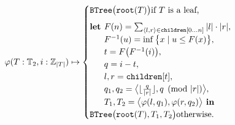 \documentclass[sigplan,nonacm]{acmart}\settopmatter{printfolios=false,printccs=false,printacmref=false}
\begin{document}
\begin{small}
\begin{equation*}\label{eq:pairing}
\varphi(T: \mathbb{T}_2, i: \mathbb{Z}_{|T|}) \mapsto \begin{cases}
\texttt{BTree}\big(\texttt{root}(T)\big) \text{if $T$ is a leaf,} \vspace{5pt}\\
\textbf{let } F(n) = \sum_{\langle l, r\rangle \in \texttt{children}[0 \ldots n]}|l|\cdot|r|,\\
\phantom{\textbf{let }} F^{-1}(u) = \inf \big\{x \mid u \leq F(x)\big\},\\
\phantom{\textbf{let }} t = F\big(F^{-1}(i)\big),\\
\phantom{\textbf{let }} q = i - t,\\
\phantom{\textbf{let }} l, r = \texttt{children}[t],\\
\phantom{\textbf{let }} q_1, q_2 = \big\langle\lfloor\frac{q}{|r|}\rfloor, q \pmod{|r|}\big\rangle,\\
\phantom{\textbf{let }} T_1, T_2 = \big\langle\varphi(l, q_1), \varphi(r, q_2)\big\rangle \textbf{ in } \\
\texttt{BTree}\big(\texttt{root}(T), T_1, T_2\big) \text{otherwise.} \\
\end{cases}
\end{equation*}
\end{small}

\end{document}
